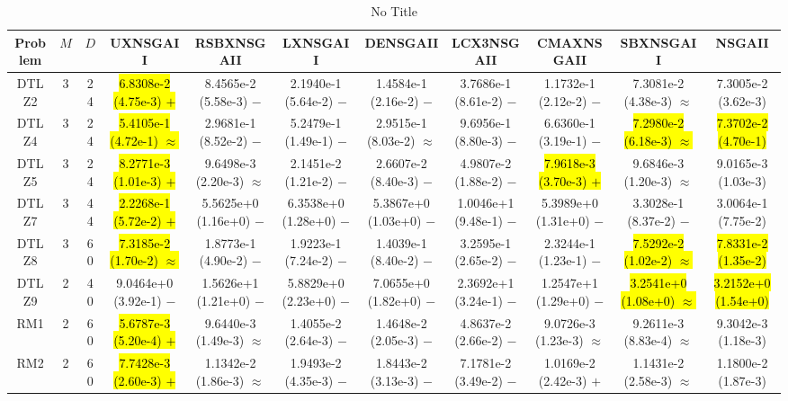 \documentclass[journal]{IEEEtran}
\begin{document}
\begin{table*}[htbp]
\renewcommand{\arraystretch}{1.2}
\centering
\caption{No Title}
\begin{tabular}{ccccccccccc}
\toprule
Problem&$M$&$D$&UXNSGAII&RSBXNSGAII&LXNSGAII&DENSGAII&LCX3NSGAII&CMAXNSGAII&SBXNSGAII&NSGAII\\
\midrule
\multirow{1}{*}{DTLZ2}&3&24&\hl{6.8308e-2 (4.75e-3) $+$}&8.4565e-2 (5.58e-3) $-$&2.1940e-1 (5.64e-2) $-$&1.4584e-1 (2.16e-2) $-$&3.7686e-1 (8.61e-2) $-$&1.1732e-1 (2.12e-2) $-$&7.3081e-2 (4.38e-3) $\approx$&7.3005e-2 (3.62e-3)\\
\hline
\multirow{1}{*}{DTLZ4}&3&24&\hl{5.4105e-1 (4.72e-1) $\approx$}&2.9681e-1 (8.52e-2) $-$&5.2479e-1 (1.49e-1) $-$&2.9515e-1 (8.03e-2) $\approx$&9.6956e-1 (8.80e-3) $-$&6.6360e-1 (3.19e-1) $-$&\hl{7.2980e-2 (6.18e-3) $\approx$}&\hl{7.3702e-2 (4.70e-1)}\\
\hline
\multirow{1}{*}{DTLZ5}&3&24&\hl{8.2771e-3 (1.01e-3) $+$}&9.6498e-3 (2.20e-3) $\approx$&2.1451e-2 (1.21e-2) $-$&2.6607e-2 (8.40e-3) $-$&4.9807e-2 (1.88e-2) $-$&\hl{7.9618e-3 (3.70e-3) $+$}&9.6846e-3 (1.20e-3) $\approx$&9.0165e-3 (1.03e-3)\\
\hline
\multirow{1}{*}{DTLZ7}&3&44&\hl{2.2268e-1 (5.72e-2) $+$}&5.5625e+0 (1.16e+0) $-$&6.3538e+0 (1.28e+0) $-$&5.3867e+0 (1.03e+0) $-$&1.0046e+1 (9.48e-1) $-$&5.3989e+0 (1.31e+0) $-$&3.3028e-1 (8.37e-2) $-$&3.0064e-1 (7.75e-2)\\
\hline
\multirow{1}{*}{DTLZ8}&3&60&\hl{7.3185e-2 (1.70e-2) $\approx$}&1.8773e-1 (4.90e-2) $-$&1.9223e-1 (7.24e-2) $-$&1.4039e-1 (8.40e-2) $-$&3.2595e-1 (2.65e-2) $-$&2.3244e-1 (1.23e-1) $-$&\hl{7.5292e-2 (1.02e-2) $\approx$}&\hl{7.8331e-2 (1.35e-2)}\\
\hline
\multirow{1}{*}{DTLZ9}&2&40&9.0464e+0 (3.92e-1) $-$&1.5626e+1 (1.21e+0) $-$&5.8829e+0 (2.23e+0) $-$&7.0655e+0 (1.82e+0) $-$&2.3692e+1 (3.24e-1) $-$&1.2547e+1 (1.29e+0) $-$&\hl{3.2541e+0 (1.08e+0) $\approx$}&\hl{3.2152e+0 (1.54e+0)}\\
\hline
\multirow{1}{*}{RM1}&2&60&\hl{5.6787e-3 (5.20e-4) $+$}&9.6440e-3 (1.49e-3) $\approx$&1.4055e-2 (2.64e-3) $-$&1.4648e-2 (2.05e-3) $-$&4.8637e-2 (2.66e-2) $-$&9.0726e-3 (1.23e-3) $\approx$&9.2611e-3 (8.83e-4) $\approx$&9.3042e-3 (1.18e-3)\\
\hline
\multirow{1}{*}{RM2}&2&60&\hl{7.7428e-3 (2.60e-3) $+$}&1.1342e-2 (1.86e-3) $\approx$&1.9493e-2 (4.35e-3) $-$&1.8443e-2 (3.13e-3) $-$&7.1781e-2 (3.49e-2) $-$&1.0169e-2 (2.42e-3) $+$&1.1431e-2 (2.58e-3) $\approx$&1.1800e-2 (1.87e-3)\\

\end{tabular}
\end{table*}
\end{document}
